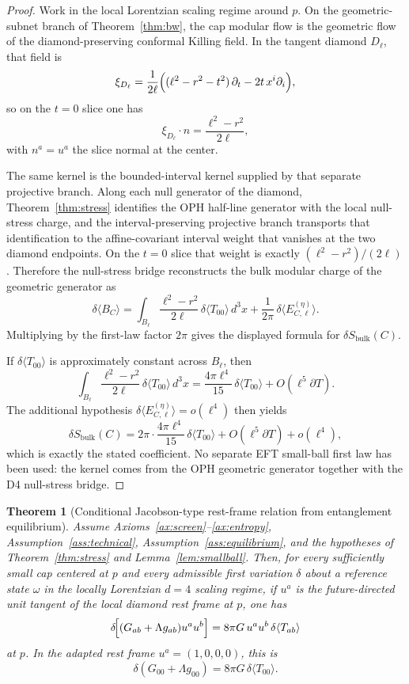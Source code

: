 \documentclass[11pt]{article}
\newtheorem{theorem}{Theorem}[section]
\begin{document}
\begin{proof}
Work in the local Lorentzian scaling regime around $p$. On the geometric-subnet branch of Theorem~\ref{thm:bw}, the cap modular flow is the geometric flow of the diamond-preserving conformal Killing field. In the tangent diamond $D_\ell$, that field is
\[
\xi_{D_\ell}
=
\frac{1}{2\ell}
\Bigl((\ell^2-r^2-t^2)\,\partial_t-2t\,x^i\partial_i\Bigr),
\]
so on the $t=0$ slice one has
\[
\xi_{D_\ell}\!\cdot n=\frac{\ell^2-r^2}{2\ell},
\]
with $n^a=u^a$ the slice normal at the center.

The same kernel is the bounded-interval kernel supplied by that separate projective branch. Along each null generator of the diamond, Theorem~\ref{thm:stress} identifies the OPH half-line generator with the local null-stress charge, and the interval-preserving projective branch transports that identification to the affine-covariant interval weight that vanishes at the two diamond endpoints. On the $t=0$ slice that weight is exactly $(\ell^2-r^2)/(2\ell)$. Therefore the null-stress bridge reconstructs the bulk modular charge of the geometric generator as
\[
\delta\langle B_C\rangle
=
\int_{B_\ell}\frac{\ell^2-r^2}{2\ell}\,\delta\langle T_{00}\rangle\,d^3x
+\frac{1}{2\pi}\,\delta\langle E^{(\eta)}_{C,\ell}\rangle.
\]
Multiplying by the first-law factor $2\pi$ gives the displayed formula for $\delta S_{\mathrm{bulk}}(C)$.

If $\delta\langle T_{00}\rangle$ is approximately constant across $B_\ell$, then
\[
\int_{B_\ell}\frac{\ell^2-r^2}{2\ell}\,\delta\langle T_{00}\rangle\,d^3x
=
\frac{4\pi\ell^4}{15}\,\delta\langle T_{00}\rangle
+O(\ell^5\partial T).
\]
\noindent
The additional hypothesis $\delta\langle E^{(\eta)}_{C,\ell}\rangle=o(\ell^4)$ then yields
\[
\delta S_{\mathrm{bulk}}(C)
=
2\pi\cdot\frac{4\pi\ell^4}{15}\,\delta\langle T_{00}\rangle
+O(\ell^5\partial T)+o(\ell^4),
\]
which is exactly the stated coefficient. No separate EFT small-ball first law has been used: the kernel comes from the OPH geometric generator together with the D4 null-stress bridge.
\end{proof}

\begin{theorem}[Conditional Jacobson-type rest-frame relation from entanglement equilibrium]\label{thm:einstein}
Assume Axioms~\ref{ax:screen}--\ref{ax:entropy}, Assumption~\ref{ass:technical}, Assumption~\ref{ass:equilibrium}, and the hypotheses of Theorem~\ref{thm:stress} and Lemma~\ref{lem:smallball}. Then, for every sufficiently small cap centered at $p$ and every admissible first variation $\delta$ about a reference state $\omega$ in the locally Lorentzian $d=4$ scaling regime, if $u^a$ is the future-directed unit tangent of the local diamond rest frame at $p$, one has
\[
\delta\!\Bigl[(G_{ab}+\Lambda g_{ab})u^a u^b\Bigr]
=
8\pi G\,u^a u^b\,\delta\langle T_{ab}\rangle
\]
at $p$. In the adapted rest frame $u^a=(1,0,0,0)$, this is
\[
\delta\!\left(G_{00}+\Lambda g_{00}\right)=8\pi G\,\delta\langle T_{00}\rangle.
\]
\end{theorem}
\end{document}
